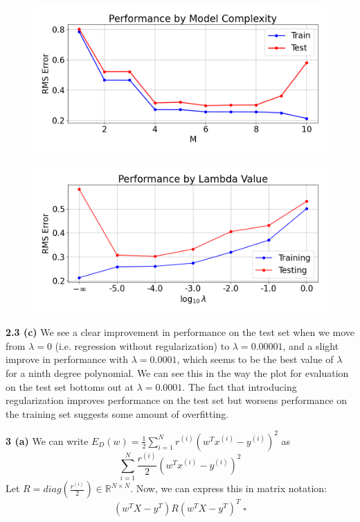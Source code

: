 \documentclass[12 pt]{article}        	%
\begin{document}
\begin{figure}[h!]
    \includegraphics[scale=0.5]{rms_model_size.png}
\end{figure}
\begin{figure}[h!]
    \includegraphics[scale=0.5]{rms_lambda_value.png}
\end{figure}

\textbf{2.3 (c)}
  We see a clear improvement in performance on the test set when we move from $ \lambda = 0 $ (i.e. regression without regularization) 
  to $ \lambda = 0.00001 $, and a slight improve in performance with $ \lambda = 0.0001 $, which seems to be the best value of $ \lambda $ 
  for a ninth degree polynomial.
  We can see this in the way the plot for evaluation on the test set bottoms out at $ \lambda = 0.0001 $. The fact that introducing regularization
  improves performance on the test set but worsens performance on the training set suggests some amount of overfitting.

\textbf{3 (a)} We can write $ E_D(w) = \frac{1}{2} \sum_{i=1}^{N} r^{(i)}(w^T x^{(i)} - y^{(i)})^2 $ as 
\begin{displaymath}
  \sum_{i=1}^{N} \frac{r^{(i)}}{2} (w^T x^{(i)} - y^{(i)})^2  
\end{displaymath}
Let $ R = diag(\frac{r^{(i)}}{2}) \in \mathbb{R}^{N \times N} $. Now, we can express this in matrix notation:
{\begin{displaymath}
  (w^T X - y^T) R (w^T X - y^T)^T \; \square  
\end{displaymath}
}
\end{document}
